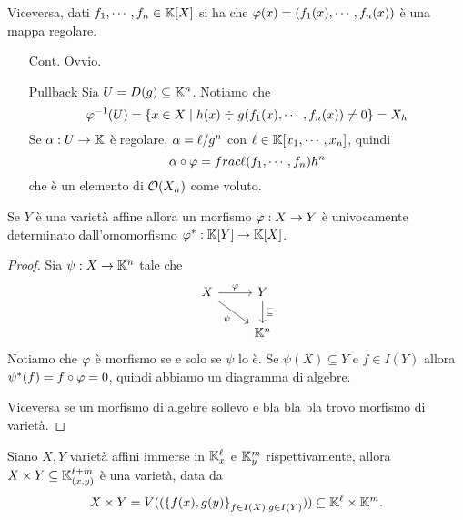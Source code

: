 Viceversa, dati $f_1,\cdots, f_n\in\mathbb{K}[X]$ si ha che $\varphi(x)=(f_1(x),\cdots, f_n(x))$ \`e una mappa regolare.
\begin{itemize}
	\item[$\boxed{\text{Cont.}}$] Ovvio.
	\item[$\boxed{\text{Pullback}}$] Sia $U=D(g)\subseteq \mathbb{K}^n$. Notiamo che
	\[\varphi^{-1}(U)=\left\{{x\in X\mid h(x)\doteqdot g(f_1(x),\cdots, f_n(x))\neq 0}\right\}=X_h\]
	Se $\alpha:U\to \mathbb{K}$ \`e regolare, $\alpha=\ell/g^n$ con $\ell\in\mathbb{K}[x_1,\cdots, x_n]$, quindi
	\[\alpha\circ \varphi=frac{\ell(f_1,\cdots,f_n)}{h^n}\]
	che \`e un elemento di $\mathcal{O}(X_h)$ come voluto.
\end{itemize}


\begin{proposition}
Se $Y$ \`e una variet\`a affine allora un morfismo $\varphi:X\to Y$ \`e univocamente determinato dall'omomorfismo $\varphi^\ast:\mathbb{K}[Y]\to\mathbb{K}[X]$.
\end{proposition}
\begin{proof}
Sia $\psi:X\to \mathbb{K}^n$ tale che 
	\[\begin{tikzcd}
		X & Y \\
		& {\K^n}
		\arrow["\vp", from=1-1, to=1-2]
		\arrow["\psi"', from=1-1, to=2-2]
		\arrow["\subseteq", from=1-2, to=2-2]
	\end{tikzcd}\]
Notiamo che $\varphi$ \`e morfismo se e solo se $\psi$ lo \`e. Se $\psi(X)\subseteq Y$ e $f\in I(Y)$ allora $\psi^\ast(f)=f\circ \varphi=0$, quindi abbiamo un diagramma di algebre.

Viceversa se un morfismo di algebre sollevo e bla bla bla trovo morfismo di variet\`a.
\end{proof}


\begin{definition}[Prodotto]
Siano $X,Y$ variet\`a affini immerse in $\mathbb{K}^\ell_x$ e $\mathbb{K}^m_y$ rispettivamente, allora $X\times Y\subseteq \mathbb{K}^{\ell+m}_{(x,y)}$ \`e una variet\`a, data da
\[X\times Y=V((\left\{{f(x),g(y)}\right\}_{f\in I(X),g\in I(Y)}))\subseteq \mathbb{K}^\ell\times\mathbb{K}^m.\]
\end{definition}


